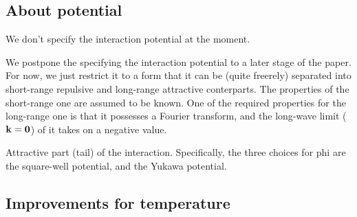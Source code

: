\subsection{About potential}
We don't specify the interaction potential at the moment.

We postpone the specifying the interaction potential to a later stage of the paper. 
For now, we just restrict it to a form that it can be (quite freerely) separated into short-range repulsive and long-range attractive conterparts.
The properties of the short-range one are assumed to be known. One of the required properties for the long-range one is that it possesses a Fourier transform, and the long-wave limit ($\bf k = 0$) of it takes on a negative value.

Attractive part (tail) of the interaction. 
Specifically, the three choices for phi are the square-well potential, and the Yukawa potential.

\subsection{Improvements for temperature}
